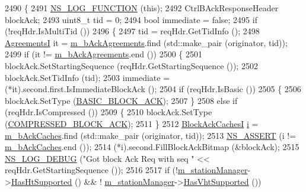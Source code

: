 \begin{DoxyCode}
2490 \{
2491   \hyperlink{log-macros-disabled_8h_a90b90d5bad1f39cb1b64923ea94c0761}{NS\_LOG\_FUNCTION} (\textcolor{keyword}{this});
2492   CtrlBAckResponseHeader blockAck;
2493   uint8\_t tid = 0;
2494   \textcolor{keywordtype}{bool} immediate = \textcolor{keyword}{false};
2495   \textcolor{keywordflow}{if} (!reqHdr.IsMultiTid ())
2496     \{
2497       tid = reqHdr.GetTidInfo ();
2498       \hyperlink{classns3_1_1MacLow_a7876cc9b328cdb0508f2a7b7647eab10}{AgreementsI} it = \hyperlink{classns3_1_1MacLow_a53482df1a7e6f136cfa8ce50fa10adc2}{m\_bAckAgreements}.find (std::make\_pair (originator, tid));
2499       \textcolor{keywordflow}{if} (it != \hyperlink{classns3_1_1MacLow_a53482df1a7e6f136cfa8ce50fa10adc2}{m\_bAckAgreements}.end ())
2500         \{
2501           blockAck.SetStartingSequence (reqHdr.GetStartingSequence ());
2502           blockAck.SetTidInfo (tid);
2503           immediate = (*it).second.first.IsImmediateBlockAck ();
2504           \textcolor{keywordflow}{if} (reqHdr.IsBasic ())
2505             \{
2506               blockAck.SetType (\hyperlink{namespacens3_a90f436472d19d7d7f37cbf0b8c288ff7a118b16b614e89a911b77a167632f89bf}{BASIC\_BLOCK\_ACK});
2507             \}
2508           \textcolor{keywordflow}{else} \textcolor{keywordflow}{if} (reqHdr.IsCompressed ())
2509             \{
2510               blockAck.SetType (\hyperlink{namespacens3_a90f436472d19d7d7f37cbf0b8c288ff7ad325114ff6e0d84c1d4cea5bd810a48c}{COMPRESSED\_BLOCK\_ACK});
2511             \}
2512           \hyperlink{classns3_1_1MacLow_ae0b0abf84b6078031fabd4e85e1cb1bf}{BlockAckCachesI} \hyperlink{bernuolliDistribution_8m_a6f6ccfcf58b31cb6412107d9d5281426}{i} = \hyperlink{classns3_1_1MacLow_a1a2b5d95cae95e9b99e6508d7d350b47}{m\_bAckCaches}.find (std::make\_pair (originator, 
      tid));
2513           \hyperlink{assert_8h_a6dccdb0de9b252f60088ce281c49d052}{NS\_ASSERT} (i != \hyperlink{classns3_1_1MacLow_a1a2b5d95cae95e9b99e6508d7d350b47}{m\_bAckCaches}.end ());
2514           (*i).second.FillBlockAckBitmap (&blockAck);
2515           \hyperlink{group__logging_ga413f1886406d49f59a6a0a89b77b4d0a}{NS\_LOG\_DEBUG} (\textcolor{stringliteral}{"Got block Ack Req with seq "} << reqHdr.GetStartingSequence ());
2516 
2517           \textcolor{keywordflow}{if} (!\hyperlink{classns3_1_1MacLow_a1c7f45f071f9e5eb97764f64e5cdaf1b}{m\_stationManager}->\hyperlink{classns3_1_1WifiRemoteStationManager_ac792dc8f3c77d507d25de0b87b52608c}{HasHtSupported} () && !
      \hyperlink{classns3_1_1MacLow_a1c7f45f071f9e5eb97764f64e5cdaf1b}{m\_stationManager}->\hyperlink{classns3_1_1WifiRemoteStationManager_afae2836c7785854272d73bf33e58c95a}{HasVhtSupported} ())

\end{DoxyCode}
